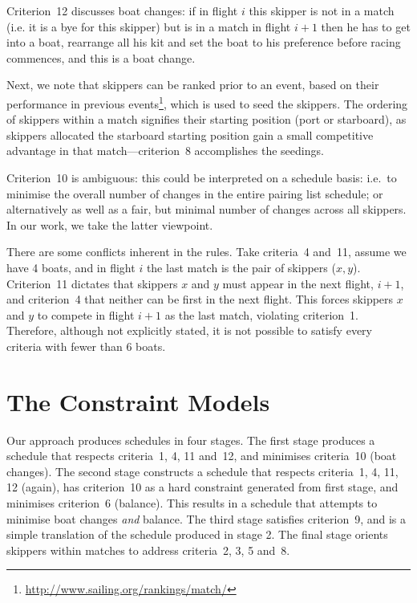 \documentclass{llncs}
\begin{document}
Criterion~12 discusses boat changes: if in flight $i$ this skipper is not in a match (i.e. it is a
bye for this skipper) but is in a match in flight $i+1$ then he has to get into a boat, rearrange
all his kit and set the boat to his preference before racing commences, and this is a boat change.

Next, we note that skippers can be ranked prior to an event, based on their performance in
previous events\footnote{\url{http://www.sailing.org/rankings/match/}}, which is used to seed the
skippers. The ordering of skippers within a match signifies their starting position (port or
starboard), as skippers allocated the starboard starting position gain a small competitive
advantage in that match---criterion~8 accomplishes the seedings.

Criterion~10 is ambiguous: this could be interpreted on a schedule basis: i.e.\ to minimise the
overall number of changes in the entire pairing list schedule; or alternatively as well as a fair,
but minimal number of changes across all skippers. In our work, we take the latter viewpoint.

There are some conflicts inherent in the rules. Take criteria~4 and~11, assume we have 4 boats, and
in flight $i$ the last match is the pair of skippers ($x,y$). Criterion~11 dictates that skippers $x$
and $y$ must appear in the next flight, $i+1$, and criterion~4 that neither can be first in the next
flight. This forces skippers $x$ and $y$ to compete in flight $i+1$ as the last match, violating
criterion~1. Therefore, although not explicitly stated, it is not possible to satisfy every criteria
with fewer than 6 boats.

\section{The Constraint Models}\label{sec:models}

Our approach produces schedules in four stages. The first stage produces a schedule that respects
criteria~1, 4, 11 and~12, and minimises criteria~10 (boat changes). The second stage constructs a
schedule that respects criteria~1, 4, 11, 12 (again), has criterion~10 as a hard constraint generated
from first stage, and minimises criterion~6 (balance). This results in a schedule that attempts to
minimise boat changes \emph{and} balance. The third stage satisfies criterion~9, and is a simple
translation of the schedule produced in stage 2.  The final stage orients skippers within matches to
address criteria~2, 3, 5 and~8.
\end{document}
